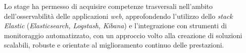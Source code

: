 Lo stage ha permesso di acquisire competenze trasversali nell'ambito dell'osservabilità delle applicazioni \emph{web}, approfondendo l'utilizzo dello \emph{stack} \emph{Elastic} (\emph{Elasticsearch, Logstash, Kibana}) e l'integrazione con strumenti di monitoraggio automatizzato, con un approccio volto alla creazione di soluzioni scalabili, robuste e orientate al miglioramento continuo delle prestazioni.



\endgroup

\vfill
